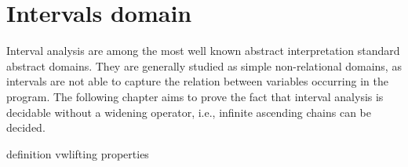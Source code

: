 \section{Intervals domain}
\label{sec:intervals}

Interval analysis are among the most well known abstract
interpretation standard abstract domains. They are generally studied
as simple non-relational domains, as intervals are not able to capture
the relation between variables occurring in the program.  The
following chapter aims to prove the fact that interval analysis is
decidable without a widening operator, i.e., infinite ascending chains
can be decided.

{definition}
{vwlifting}
{properties}
